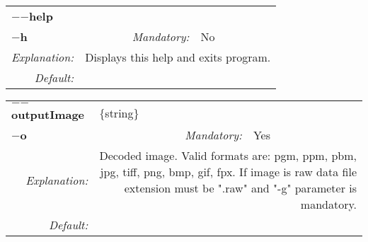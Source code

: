 \begin{center}\begin{tabular}{|rr|rlrl|}
\hline
\multicolumn{2}{|l|}{\textbf{$-$$-$help}} & \multicolumn{4}{|l|}{} \\
\cline{3-6}
\multicolumn{2}{|l|}{\textbf{$-$h}} & \emph{Mandatory:} & No & &  \\
\hline
\emph{Explanation:} & \multicolumn{5}{|p{12cm}|}{Displays this help and exits program.} \\
\hline
\emph{Default:} & \multicolumn{5}{|p{12cm}|}{} \\
\hline
\end{tabular}\end{center}
\begin{center}\begin{tabular}{|rr|rlrl|}
\hline
\multicolumn{2}{|l|}{\textbf{$-$$-$outputImage}} & \multicolumn{4}{|l|}{$\{$string$\}$} \\
\cline{3-6}
\multicolumn{2}{|l|}{\textbf{$-$o}} & \emph{Mandatory:} & Yes & &  \\
\hline
\emph{Explanation:} & \multicolumn{5}{|p{12cm}|}{Decoded image. Valid formats are: pgm, ppm, pbm, jpg, tiff, png, bmp, gif, fpx. If image is raw data file extension must be ".raw" and "-g" parameter is mandatory.} \\
\hline
\emph{Default:} & \multicolumn{5}{|p{12cm}|}{} \\
\hline
\end{tabular}\end{center}
